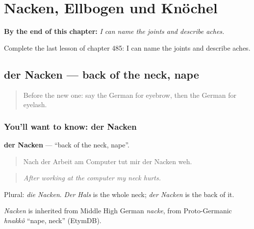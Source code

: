
\chapter{Nacken, Ellbogen und Knöchel}
\label{ch:ge-nacken-ellbogen-und-knochel}

\begin{chapteropening}
\textbf{By the end of this chapter:} \emph{I can name the joints and describe aches.}

Complete the last lesson of chapter 485: I can name the joints and describe aches.
\end{chapteropening}

\section[der Nacken]{der Nacken — back of the neck, nape}

\label{lesson:GE-C485-nacken}



\begin{quote}
Before the new one: say the German for eyebrow, then the German for eyelash.
\end{quote}

\subsection*{You'll want to know: der Nacken}
\textbf{der Nacken} — \textquotedblleft{}back of the neck, nape\textquotedblright{}.

\begin{quote}
Nach der Arbeit am Computer tut mir der Nacken weh.
\end{quote}

\begin{quote}
\emph{After working at the computer my neck hurts.}
\end{quote}

Plural: \emph{die Nacken}. \emph{Der Hals} is the whole neck; \emph{der Nacken} is the back of it.

\begin{cousinweb}
\emph{Nacken} is inherited from Middle High German \emph{nacke}, from Proto-Germanic \emph{hnakkô} \textquotedblleft{}nape, neck\textquotedblright{} (EtymDB).
\end{cousinweb}

